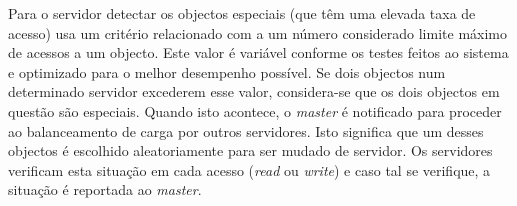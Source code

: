 Para o servidor detectar os objectos especiais (que têm uma elevada taxa de acesso) usa um critério relacionado com a um número considerado limite máximo de acessos a um objecto. Este valor é variável conforme os testes feitos ao sistema e optimizado para o melhor desempenho possível. Se dois objectos num determinado servidor excederem esse valor, considera-se que os dois objectos em questão são especiais. Quando isto acontece, o \textit{master} é notificado para proceder ao balanceamento de carga por outros servidores. Isto significa que um desses objectos é escolhido aleatoriamente para ser mudado de servidor. Os servidores verificam esta situação em cada acesso (\textit{read} ou \textit{write}) e caso tal se verifique, a situação é reportada ao \textit{master}.
